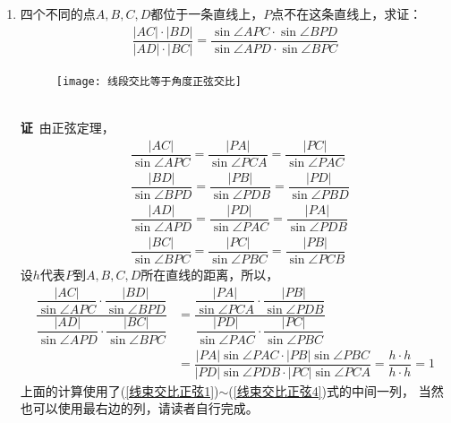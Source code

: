 \begin{enumerate}[label={【\textbf{例\thechapter.\arabic*}】},
 leftmargin=\inteval{\myenumleftmargin}pt,
 itemsep=\inteval{\myenumitempsep}pt,
 itemindent=\inteval{\myenumitemindent}pt]
\item 四个不同的点$ A,B,C,D $都位于一条直线上，$ P $点不在这条直线上，求证：
\begin{gather*}
    \dfrac{|AC|\cdot|BD|}{|AD|\cdot|BC|}=
    \dfrac{\sin\angle APC\cdot \sin\angle BPD}
    {\sin\angle APD\cdot \sin\angle BPC}
\end{gather*}
\begin{figure}[!ht]
    \centering
    \texttt{[image: 线段交比等于角度正弦交比]}
\end{figure}
\\
\textbf{证}\ 由正弦定理，
\begin{align}
    & \dfrac{|AC|}{\sin\angle APC}=\dfrac{|PA|}{\sin\angle PCA}
    =\dfrac{|PC|}{\sin\angle PAC} \label{线束交比正弦1} \\
    & \dfrac{|BD|}{\sin\angle BPD}=\dfrac{|PB|}{\sin\angle PDB} 
    =\dfrac{|PD|}{\sin\angle PBD} \label{线束交比正弦2}\\
    & \dfrac{|AD|}{\sin\angle APD}=\dfrac{|PD|}{\sin\angle PAC}
    =\dfrac{|PA|}{\sin\angle PDB} \label{线束交比正弦3}\\    
    & \dfrac{|BC|}{\sin\angle BPC}=\dfrac{|PC|}{\sin\angle PBC}
    =\dfrac{|PB|}{\sin\angle PCB} \label{线束交比正弦4}
\end{align}
设$ h $代表$ P $到$ A,B,C,D $所在直线的距离，所以，
\begin{align*}
    \dfrac{\dfrac{|AC|}{\sin\angle APC}\cdot \dfrac{|BD|}{\sin\angle BPD}}
    {\dfrac{|AD|}{\sin\angle APD}\cdot \dfrac{|BC|}{\sin\angle BPC}} &=
    \dfrac{\dfrac{|PA|}{\sin\angle PCA}\cdot \dfrac{|PB|}{\sin\angle PDB}}
    {\dfrac{|PD|}{\sin\angle PAC}\cdot \dfrac{|PC|}{\sin\angle PBC}} \\
    &=\dfrac{|PA|\sin\angle PAC\cdot |PB|\sin\angle PBC}
    {|PD|\sin\angle PDB\cdot |PC|\sin\angle PCA}=\dfrac{h\cdot h}{h\cdot h}=1 
\end{align*}
上面的计算使用了(\ref{线束交比正弦1})$ \sim $(\ref{线束交比正弦4})式的中间一列，
当然也可以使用最右边的列，请读者自行完成。


\end{enumerate}

